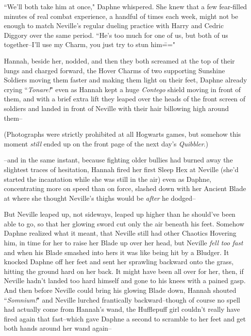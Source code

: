 \later

``We'll both take him at once," Daphne whispered. She knew that a few fear-filled minutes of real combat experience, a handful of times each week, might not be enough to match Neville's regular dueling practice with Harry and Cedric Diggory over the same period. ``He's too much for one of us, but both of us together\---I'll use my Charm, you just try to stun him\==="

Hannah, beside her, nodded, and then they both screamed at the top of their lungs and charged forward, the Hover Charms of two supporting Sunshine Soldiers moving them faster and making them light on their feet, Daphne already crying ``\emph{Tonare!}" even as Hannah kept a huge \emph{Contego} shield moving in front of them, and with a brief extra lift they leaped over the heads of the front screen of soldiers and landed in front of Neville with their hair billowing high around them\---

(Photographs were strictly prohibited at all Hogwarts games, but somehow this moment \emph{still} ended up on the front page of the next day's \emph{Quibbler}.)

\---and in the same instant, because fighting older bullies had burned away the slightest traces of hesitation, Hannah fired her first Sleep Hex at Neville (she'd started the incantation while she was still in the air) even as Daphne, concentrating more on speed than on force, slashed down with her Ancient Blade at where she thought Neville's thighs would be \emph{after} he dodged\---

But Neville leaped up, not sideways, leaped up higher than he should've been able to go, so that her glowing sword cut only the air beneath his feet. Somehow Daphne realized what it meant, that Neville still had other Chaotics Hovering him, in time for her to raise her Blade up over her head, but Neville \emph{fell too fast} and when his Blade smashed into hers it was like being hit by a Bludger. It knocked Daphne off her feet and sent her sprawling backward onto the grass, hitting the ground hard on her back. It might have been all over for her, then, if Neville hadn't landed too hard himself and gone to his knees with a pained gasp. And then before Neville could bring his glowing Blade down, Hannah shouted ``\emph{Somnium!}" and Neville lurched frantically backward\---though of course no spell had actually come from Hannah's wand, the Hufflepuff girl couldn't really have fired again that fast\---which gave Daphne a second to scramble to her feet and get both hands around her wand again\---

